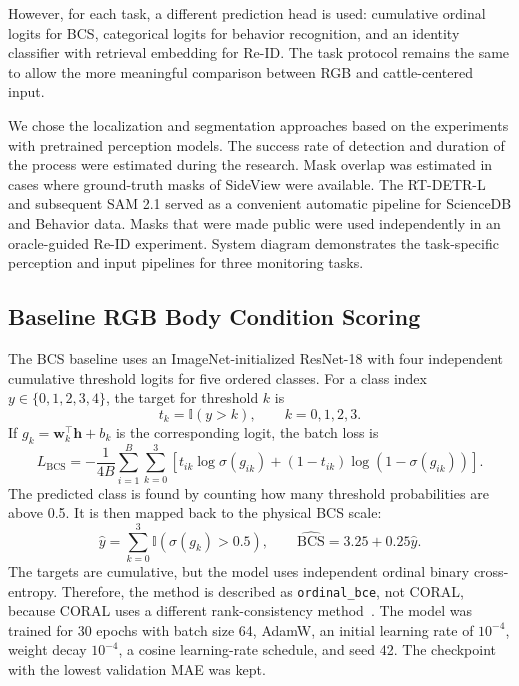 However, for each task, a different prediction head is used: cumulative ordinal logits for BCS, categorical logits for behavior recognition, and an identity classifier with retrieval embedding for Re-ID. The task protocol remains the same to allow the more meaningful comparison between RGB and cattle-centered input.

We chose the localization and segmentation approaches based on the experiments with pretrained perception models. The success rate of detection and duration of the process were estimated during the research. Mask overlap was estimated in cases where ground-truth masks of SideView were available. The RT-DETR-L and subsequent SAM 2.1 served as a convenient automatic pipeline for ScienceDB and Behavior data. Masks that were made public were used independently in an oracle-guided Re-ID experiment. System diagram demonstrates the task-specific perception and input pipelines for three monitoring tasks.



\subsection{Baseline RGB Body Condition Scoring}

The BCS baseline uses an ImageNet-initialized ResNet-18 with four independent cumulative threshold logits for five ordered classes. For a class index $y\in\{0,1,2,3,4\}$, the target for threshold $k$ is
\begin{equation}
 t_k=\mathbb{I}(y>k),\qquad k=0,1,2,3.
\end{equation}
If $g_k=\mathbf{w}_k^\top\mathbf{h}+b_k$ is the corresponding logit, the batch loss is
\begin{equation}\label{eq:bcs_loss}
 L_{\mathrm{BCS}}=-\frac{1}{4B}\sum_{i=1}^{B}\sum_{k=0}^{3}
 \left[t_{ik}\log\sigma(g_{ik})+(1-t_{ik})\log(1-\sigma(g_{ik}))\right].
\end{equation}
The predicted class is found by counting how many threshold probabilities are above 0.5. It is then mapped back to the physical BCS scale:
\begin{equation}
 \hat y=\sum_{k=0}^{3}\mathbb{I}(\sigma(g_k)>0.5),\qquad
 \widehat{\mathrm{BCS}}=3.25+0.25\hat y.
\end{equation}
The targets are cumulative, but the model uses independent ordinal binary cross-entropy. Therefore, the method is described as \texttt{ordinal\_bce}, not CORAL, because CORAL uses a different rank-consistency method~\cite{coral2020}. The model was trained for 30 epochs with batch size 64, AdamW, an initial learning rate of $10^{-4}$, weight decay $10^{-4}$, a cosine learning-rate schedule, and seed 42. The checkpoint with the lowest validation MAE was kept.

